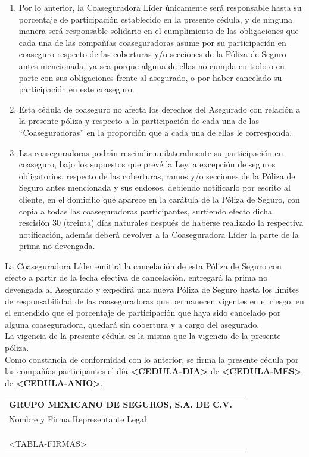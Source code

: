 ﻿\documentclass[letterpaper,10pt]{article}
\begin{document}
\begin{enumerate}
\begin{enumerate}
            \item Por lo anterior, la Coaseguradora Líder únicamente será responsable hasta su porcentaje de participación establecido en la presente cédula, y de ninguna manera será responsable solidario en el cumplimiento de las obligaciones que cada una de las compañías coaseguradoras asume por su participación en coaseguro respecto de las coberturas y/o secciones de la Póliza de Seguro antes mencionada, ya sea porque alguna de ellas no cumpla en todo o en parte con sus obligaciones frente al asegurado, o por haber cancelado su participación en este coaseguro.
            \item Esta cédula de coaseguro no afecta los derechos del Asegurado con relación a la presente póliza y respecto a la participación de cada una de las ``Coaseguradoras'' en la proporción que a cada una de ellas le corresponda.
            \item Las coaseguradoras podrán rescindir unilateralmente su participación en coaseguro, bajo los supuestos que prevé la Ley, a excepción de seguros obligatorios, respecto de las coberturas, ramos y/o secciones de la Póliza de Seguro antes mencionada y sus endosos, debiendo notificarlo por escrito al cliente, en el domicilio que aparece en la carátula de la Póliza de Seguro, con copia a todas las coaseguradoras participantes, surtiendo efecto dicha rescisión 30 (treinta) días naturales después de haberse realizado la respectiva notificación, además deberá devolver a la Coaseguradora Líder la parte de la prima no devengada.
        \end{enumerate}
\end{enumerate}

La Coaseguradora Líder emitirá la cancelación de esta Póliza de Seguro con efecto a partir de la fecha efectiva de cancelación, entregará la prima no devengada al Asegurado y expedirá una nueva Póliza de Seguro hasta los límites de responsabilidad de las coaseguradoras que permanecen vigentes en el riesgo, en el entendido que el porcentaje de participación que haya sido cancelado por alguna coaseguradora, quedará sin cobertura y a cargo del asegurado.\\

La vigencia de la presente cédula es la misma que la vigencia de la presente póliza.\\

Como constancia de conformidad con lo anterior, se firma la presente cédula por las compañías participantes el día \textbf{\underline{<CEDULA-DIA>}} de \textbf{\underline{<CEDULA-MES>}} de \textbf{\underline{<CEDULA-ANIO>}}.\\

\begin{center}
    \begin{tabularx}{\textwidth}{Xr}
        \textbf{GRUPO MEXICANO DE SEGUROS, S.A. DE C.V.} &\\
        Nombre y Firma Representante Legal & \underline{\hspace{5cm}}\\\\\\\\
        <TABLA-FIRMAS>
    \end{tabularx}
\end{center}
\end{document}
